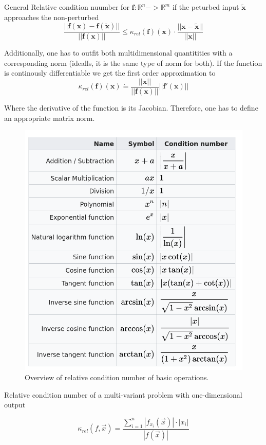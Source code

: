 \documentclass[
    a4paper,
    11pt
]{article}
\begin{document}
General Relative condition nuumber for $\mathbf{f}:\mathbb{R}^n -> \mathbb{R}^m$ if the
peturbed input $\mathbf{\tilde{x}}$ approaches the non-perturbed
\begin{equation}
    \frac{||\mathbf{f}(\mathbf{x}) -
    \mathbf{f}(\mathbf{\tilde{x}})||}{||\mathbf{f}(\mathbf{x})||} \le
    \kappa_{rel}(\mathbf{f})(\mathbf{x}) \cdot
    \frac{||\mathbf{x} - \mathbf{\tilde{x}}||}{||\mathbf{x}||}
\end{equation}

Additionally, one has to outfit both multidimensional quantitities with a
corresponding norm (idealls, it is the same type of norm for both). If the
function is continously differentiable we get the first order approximation to
\begin{equation}
    \kappa_{rel}(\mathbf{f})(\mathbf{x}) \dot{=}
    \frac{||\mathbf{x}||}{||\mathbf{f}(\mathbf{x})||}
    ||\mathbf{f}'(\mathbf{x})||
\end{equation}

Where the derivative of the function is its Jacobian. Therefore, one has to
define an appropriate matrix norm.

\begin{figure}[H]
    \centering
    \includegraphics[width=0.5\linewidth]{basicOperations.png}
    \caption{Overview of relative condition number of basic operations.}
\end{figure}

Relative condition number of a multi-variant problem with one-dimensional output

\begin{equation}
    \kappa_{rel}(f, \vec{x}) =
    \frac{
        \sum_{i=1}^{n} \left| f_{x_i}(\vec{x}) \right| \cdot |x_i|
    } {
        \left| f(\vec{x}) \right|
    }
\end{equation}
\end{document}
